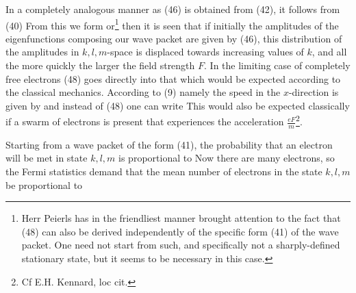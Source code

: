 \begin{paper}{1}
In a completely analogous manner as (46) is obtained from (42), it follows from (40)
From this we form
or\footnote{Herr Peierls has in the friendliest manner brought attention to the fact that (48) can also be derived independently of the specific form (41) of the wave packet. One need not start from such, and specifically not a sharply-defined stationary state, but it seems to be necessary in this case.}
then it is seen that if initially the amplitudes of the eigenfunctions composing our wave packet are given by (46), this distribution of the amplitudes in $k,l,m$-space is displaced towards increasing values of $k$, and all the more quickly the larger the field strength $F$. In the limiting case of completely free electrons (48) goes directly into that which would be expected according to the classical mechanics. According  to (9) namely the speed in the $x$-direction is given by
and instead of (48) one can write
This would also be expected classically if a swarm of electrons is present that experiences the acceleration $\frac{eF}{m}$\footnote{Cf E.H. Kennard, loc cit.}.

Starting from a wave packet of the form (41), the probability that an electron will be met in state $k,l,m$ is proportional to
Now there are many electrons, so the Fermi statistics demand that the mean number of electrons in the state $k,l,m$ be proportional to


\end{paper}
